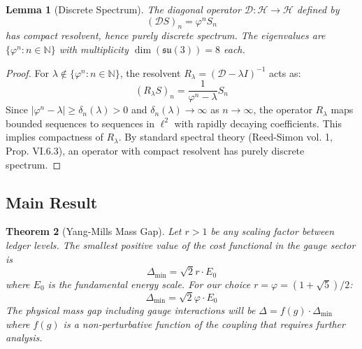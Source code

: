 \documentclass[11pt]{article}
\numberwithin{equation}{section}
\newtheorem{theorem}{Theorem}[section]
\newtheorem{lemma}[theorem]{Lemma}
\theoremstyle{definition}
\theoremstyle{remark}
\begin{document}
\begin{lemma}[Discrete Spectrum]
\label{lem:discrete-spectrum}
The diagonal operator $\mathcal{D}: \mathcal{H} \to \mathcal{H}$ defined by
\begin{equation}
(\mathcal{D}S)_n = \varphi^n S_n
\end{equation}
has compact resolvent, hence purely discrete spectrum. The eigenvalues are $\{\varphi^n : n \in \mathbb{N}\}$ with multiplicity $\dim(\mathfrak{su}(3)) = 8$ each.
\end{lemma}

\begin{proof}
For $\lambda \notin \{\varphi^n : n \in \mathbb{N}\}$, the resolvent $R_{\lambda} = (\mathcal{D} - \lambda I)^{-1}$ acts as:
\begin{equation}
(R_{\lambda}S)_n = \frac{1}{\varphi^n - \lambda} S_n
\end{equation}
Since $|\varphi^n - \lambda| \geq \delta_n(\lambda) > 0$ and $\delta_n(\lambda) \to \infty$ as $n \to \infty$, the operator $R_{\lambda}$ maps bounded sequences to sequences in $\ell^2$ with rapidly decaying coefficients. This implies compactness of $R_{\lambda}$. By standard spectral theory (Reed-Simon vol. 1, Prop. VI.6.3), an operator with compact resolvent has purely discrete spectrum.
\end{proof}

\subsection{Main Result}

\begin{theorem}[Yang-Mills Mass Gap]
\label{thm:mass-gap}
Let $r > 1$ be any scaling factor between ledger levels. The smallest positive value of the cost functional in the gauge sector is
\begin{equation}
\Delta_{\text{min}} = \sqrt{2} r \cdot E_0
\end{equation}
where $E_0$ is the fundamental energy scale. For our choice $r = \varphi = (1+\sqrt{5})/2$:
\begin{equation}
\Delta_{\text{min}} = \sqrt{2} \varphi \cdot E_0
\end{equation}
The physical mass gap including gauge interactions will be $\Delta = f(g) \cdot \Delta_{\text{min}}$ where $f(g)$ is a non-perturbative function of the coupling that requires further analysis.
\end{theorem}
\end{document}

